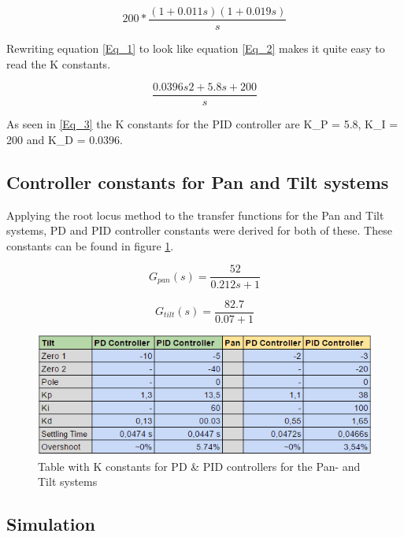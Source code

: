 \begin{equation}
200*\frac{(1+0.011s)(1+0.019s)}{s}
\label{Eq_1} 
\end{equation}

Rewriting equation \ref{Eq_1} to look like equation \ref{Eq_2} makes it quite easy to read the K constants.

\begin{equation}
\frac{0.0396s2 +5.8s+200}{s}
\label{Eq_3}
\end{equation}

As seen in \ref{Eq_3} the K constants for the PID controller are K\_P = 5.8, K\_I = 200 and K\_D = 0.0396.

\subsection{Controller constants for Pan and Tilt systems}

Applying the root locus method to the transfer functions for the Pan and Tilt systems, PD and PID controller constants were derived for both of these. These constants can be found in figure \ref{fig:PIDControllerTable}.

\begin{equation}
G_{pan}(s)=\frac{52}{0.212s+1}
\end{equation}

\begin{equation}
G_{tilt}(s)=\frac{82.7}{0.07+1}
\end{equation}

\begin{figure}[h!]
\centering
\includegraphics[scale=0.7]{Billeder/PIDControllerTable.png}
\caption{Table with K constants for PD \& PID controllers for the Pan- and Tilt systems}
\label{fig:PIDControllerTable}
\end{figure}

\subsection{Simulation}

